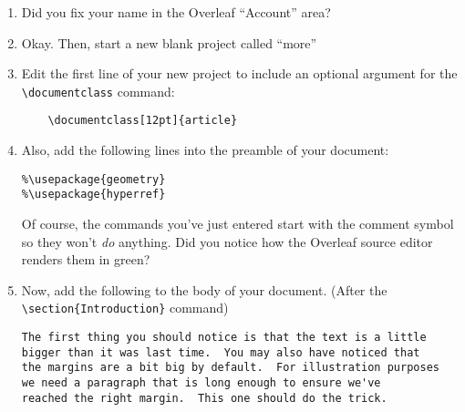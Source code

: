 \begin{enumerate}
	\item Did you fix your name in the Overleaf ``Account'' area?
	\item Okay. Then, start a new blank project called ``more''
	\item Edit the first line of your new project to include an optional argument for the \verb+\documentclass+ command:
	\medskip

\begin{codeblock}
\begin{verbatim}
	\documentclass[12pt]{article}
\end{verbatim}
\end{codeblock}
\medskip

	\item Also, add the following lines into the preamble of your document:
\medskip

\begin{codeblock}
\begin{verbatim}
%\usepackage{geometry}
%\usepackage{hyperref}
\end{verbatim}
\end{codeblock}

Of course, the commands you've just entered start with the comment symbol so they won't {\em do} anything.  Did you notice how the Overleaf source editor renders them in green?

	\item Now, add the following to the body of your document.  (After the \verb+\section{Introduction}+ command)
\medskip

\begin{codeblock}
\begin{verbatim}
The first thing you should notice is that the text is a little
bigger than it was last time.  You may also have noticed that 
the margins are a bit big by default.  For illustration purposes 
we need a paragraph that is long enough to ensure we've 
reached the right margin.  This one should do the trick.
\end{verbatim}
\end{codeblock}
\medskip


\end{enumerate}
